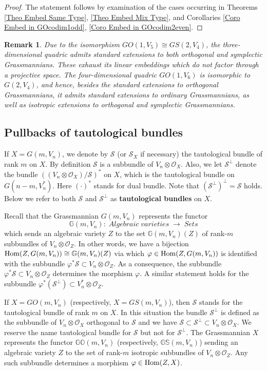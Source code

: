 \documentclass[12pt]{amsart}
\def\GG {{\mathbb G}}     %
\def\OO {{\mathbb O}}     %
\def\SS {{\mathbb S}}     %
\def\mc {\mathcal}
\newtheorem{rem}{Remark}[section]
\begin{document}
\begin{proof}
The statement follows by examination of the cases occurring in Theorems \ref{Theo Embed Same Type}, \ref{Theo Embed Mix Type}, and Corollaries \ref{Coro Embed in GOcodim1odd}, \ref{Coro Embed in GOcodim2even}.
\end{proof}

\begin{rem}
Due to the isomorphism $GO(1,V_5)\cong GS(2,V_4)$, the three-dimensional quadric admits standard extensions to both orthogonal and symplectic Grassmannians. These exhaust its linear embeddings which do not factor through a projective space. The four-dimensional quadric $GO(1,V_6)$ is isomorphic to $G(2,V_4)$, and hence, besides the standard extensions to orthogonal Grassmannians, it admits standard extensions to ordinary Grassmannians, as well as isotropic extensions to orthogonal and symplectic Grassmannians.
\end{rem}


\subsection{Pullbacks of tautological bundles}\label{Sec Pullbacks}

If $X=G(m,V_n)$, we denote by $\mc S$ (or $\mc S_{X}$ if necessary) the tautological bundle of rank $m$ on $X$. By definition $\mc S$ is a subbundle of $V_n\otimes \mc O_X$. Also, we let $\mc S^\perp$ denote the bundle $((V_n\otimes \mc O_X)/\mc S)^*$ on $X$, which is the tautological bundle on $G(n-m,V_n^*)$. Here $(\cdot)^*$ stands for dual bundle. Note that $(\mc S^\perp)^\perp=\mc S$ holds. Below we refer to both $\mc S$ and $\mc S^\perp$ as {\bf tautological bundles} on $X$.

Recall that the Grassmannian $G(m,V_n)$ represents the functor
$$
\GG(m,V_n) : \;Algebraic\; varieties\; \to\; Sets
$$
which sends an algebraic variety $Z$ to the set $\GG(m,V_n)(Z)$ of rank-$m$ subbundles of $V_n\otimes \mc O_Z$. In other words, we have a bijection ${\rm Hom}(Z,G(m,V_n))\cong\GG(m,V_n)(Z)$ via which $\varphi\in {\rm Hom}(Z,G(m,V_n))$ is identified with the subbundle $\varphi^* \mc S\subset V_n\otimes \mc O_Z$. As a consequence, the subbundle $\varphi^* \mc S\subset V_n\otimes \mc O_Z$ determines the morphism $\varphi$. A similar statement holds for the subbundle $\varphi^*(\mc S^\perp)\subset V_n^*\otimes \mc O_Z$.

If $X=GO(m,V_n)$ (respectively, $X=GS(m,V_n)$), then $\mc S$ stands for the tautological bundle of rank $m$ on $X$. In this situation the bundle $\mc S^\perp$ is defined as the subbundle of $V_n\otimes\mc O_X$ orthogonal to $\mc S$ and we have $\mc S\subset \mc S^\perp\subset V_n\otimes \mc O_X$. We reserve the name tautological bundle for $\mc S$ but not for $\mc S^\perp$. The Grassmannian $X$ represents the functor $\GG\OO(m,V_n)$ (respectively, $\GG\SS(m,V_n)$) sending an algebraic variety $Z$ to the set of rank-$m$ isotropic subbundles of $V_n\otimes \mc O_Z$. Any such subbundle determines a morphism $\varphi\in {\rm Hom}(Z,X)$.
\end{document}
